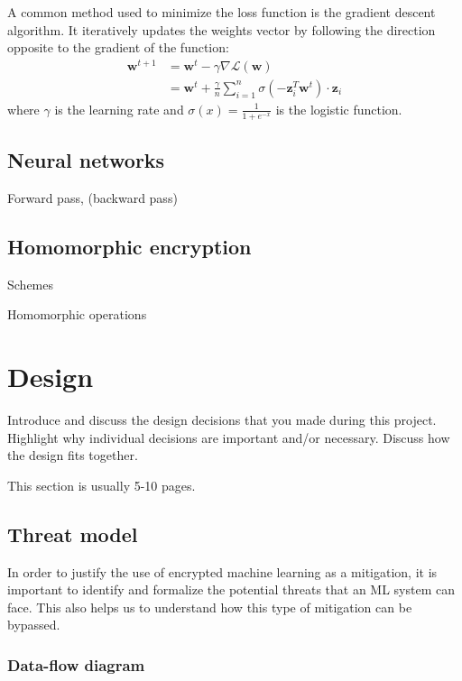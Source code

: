 \documentclass[a4paper,11pt,oneside]{report}
\begin{document}
A common method used to minimize the loss function is the gradient descent algorithm. It iteratively updates the weights vector by following the direction opposite to the gradient of the function:
\begin{align}\label{gradient_descent}
    \mathbf{w}^{t+1} & = \mathbf{w}^t - \gamma\nabla\mathcal{L}(\mathbf{w}) \nonumber \\ 
    & = \mathbf{w}^t + \frac{\gamma}{n} \sum_{i=1}^{n} \sigma(-\mathbf{z}_i^T \mathbf{w}^t) \cdot \mathbf{z}_i
\end{align}
where $\gamma$ is the learning rate and $\sigma(x) = \frac{1}{1 + e^{-x}}$ is the logistic function.

\section{Neural networks}

Forward pass, (backward pass)

\section{Homomorphic encryption}

Schemes

Homomorphic operations


\chapter{Design}

Introduce and discuss the design decisions that you made during this project.
Highlight why individual decisions are important and/or necessary. Discuss
how the design fits together.

This section is usually 5-10 pages.

\section{Threat model}

In order to justify the use of encrypted machine learning as a mitigation, it is important to identify and formalize the potential threats that an ML system can face. This also helps us to understand how this type of mitigation can be bypassed.

\subsection{Data-flow diagram}
\end{document}

